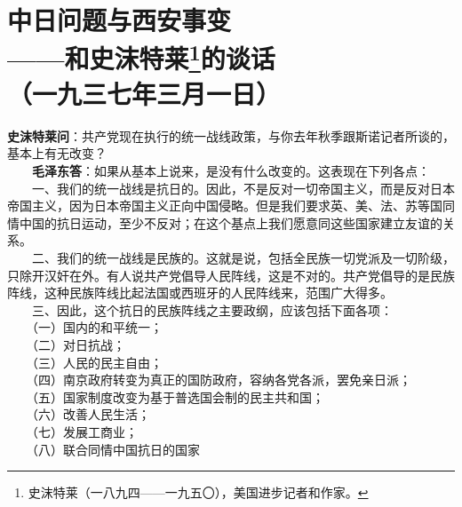 \documentclass[cn,11pt,chinese]{elegantbook}
\def\myformat#1{\hfil\hfil #1}
\begin{document}
\section*{\myformat{中日问题与西安事变}\\\myformat{——和史沫特莱\footnote[1]{史沫特莱（一八九四——一九五〇），美国进步记者和作家。}的谈话} \\
\myformat{（一九三七年三月一日）}}
\textbf{史沫特莱问}：共产党现在执行的统一战线政策，与你去年秋季跟斯诺记者所谈的，基本上有无改变？\\
　　\textbf{毛泽东答}：如果从基本上说来，是没有什么改变的。这表现在下列各点：\\
　　一、我们的统一战线是抗日的。因此，不是反对一切帝国主义，而是反对日本帝国主义，因为日本帝国主义正向中国侵略。但是我们要求英、美、法、苏等国同情中国的抗日运动，至少不反对；在这个基点上我们愿意同这些国家建立友谊的关系。\\
　　二、我们的统一战线是民族的。这就是说，包括全民族一切党派及一切阶级，只除开汉奸在外。有人说共产党倡导人民阵线，这是不对的。共产党倡导的是民族阵线，这种民族阵线比起法国或西班牙的人民阵线来，范围广大得多。\\
　　三、因此，这个抗日的民族阵线之主要政纲，应该包括下面各项：\\
　　（一）国内的和平统一；\\
　　（二）对日抗战；\\
　　（三）人民的民主自由；\\
　　（四）南京政府转变为真正的国防政府，容纳各党各派，罢免亲日派；\\
　　（五）国家制度改变为基于普选国会制的民主共和国；\\
　　（六）改善人民生活；\\
　　（七）发展工商业；\\
　　（八）联合同情中国抗日的国家\\
\end{document}
